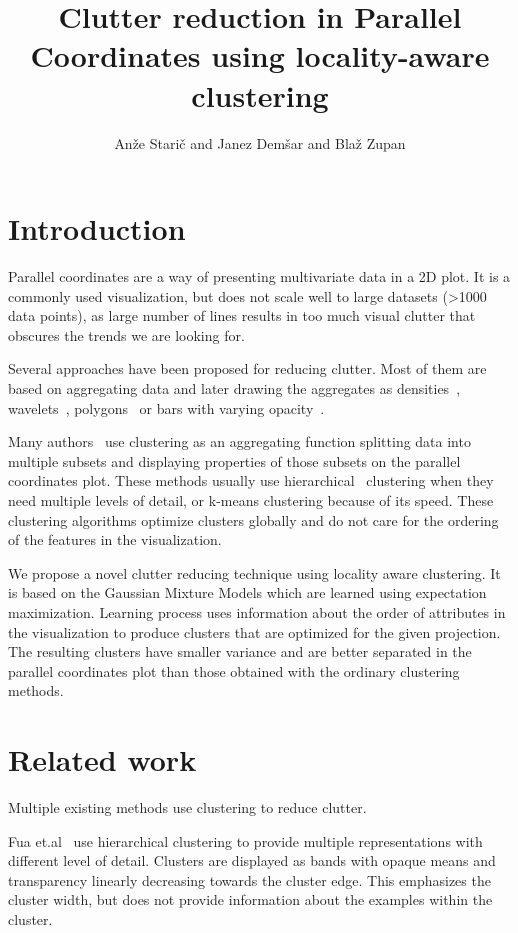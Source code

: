 \documentclass[10pt,a4paper]{article}
\title{Clutter reduction in Parallel Coordinates using locality-aware clustering}
\author{An\v{z}e Stari\v{c} and Janez Dem\v{s}ar and Bla\v{z} Zupan}
\begin{document}
\maketitle
\section{Introduction}
Parallel coordinates are a way of presenting multivariate data in a 2D plot. It is a commonly used visualization, but does not scale well to large datasets (>1000 data points), as large number of lines results in too much visual clutter that obscures the trends we are looking for.

Several approaches have been proposed for reducing clutter. Most of them are based on aggregating data and later drawing the aggregates as densities~\cite{HW09}, wavelets~\cite{RZH12}, polygons~\cite{AA04, N04} or bars with varying opacity~\cite{BH03,FWR99b}.

Many authors~\cite{FWR99b,JLJC05,N04,AA04} use clustering as an aggregating function splitting data into multiple subsets and displaying properties of those subsets on the parallel coordinates plot. These methods usually use hierarchical~\cite{FWR99b} clustering when they need multiple levels of detail, or k-means clustering because of its speed. These clustering algorithms optimize clusters globally and do not care for the ordering of the features in the visualization.

We propose a novel clutter reducing technique using locality aware clustering. It is based on the Gaussian Mixture Models which are learned using expectation maximization. Learning process uses information about the order of attributes in the visualization to produce clusters that are optimized for the given projection. The resulting clusters have smaller variance and are better separated in the parallel coordinates plot than those obtained with the ordinary clustering methods.

\section{Related work}
Multiple existing methods use clustering to reduce clutter.

Fua et.al~\cite{FWR99b} use hierarchical clustering to provide multiple representations with different level of detail. Clusters are displayed as bands with opaque means and transparency linearly decreasing towards the cluster edge. This emphasizes the cluster width, but does not provide information about the examples within the cluster.
\end{document}
